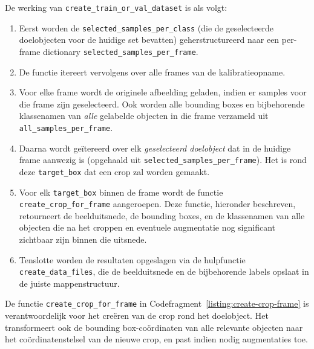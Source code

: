 De werking van \texttt{create\_train\_or\_val\_dataset} is als volgt:
\begin{enumerate}
    \item Eerst worden de \texttt{selected\_samples\_per\_class} (die de geselecteerde doelobjecten voor de huidige set bevatten) 
    geherstructureerd naar een per-frame dictionary \texttt{selected\_samples\_per\_frame}.
    \item De functie itereert vervolgens over alle frames van de kalibratieopname.
    \item Voor elke frame wordt de originele afbeelding geladen, indien er samples voor die frame zijn geselecteerd. 
    Ook worden alle bounding boxes en bijbehorende klassenamen van 
    \textit{alle} gelabelde objecten in die frame verzameld uit \texttt{all\_samples\_per\_frame}.
    \item Daarna wordt geïtereerd over elk \textit{geselecteerd doelobject}
    dat in de huidige frame aanwezig is (opgehaald uit \texttt{selected\_samples\_per\_frame}). 
    Het is rond deze \texttt{target\_box} dat een crop zal worden gemaakt.
    \item Voor elk \texttt{target\_box} binnen de frame wordt de functie \texttt{create\_crop\_for\_frame} aangeroepen. 
    Deze functie, hieronder beschreven, retourneert de beelduitsnede, de bounding boxes, en de klassenamen 
    van alle objecten die na het croppen en eventuele augmentatie nog significant zichtbaar zijn binnen die uitsnede.
    \item Tenslotte worden de resultaten opgeslagen via de hulpfunctie \texttt{create\_data\_files},
    die de beelduitsnede en de bijbehorende labels opslaat in de juiste mappenstructuur.
\end{enumerate}

De functie \texttt{create\_crop\_for\_frame} in Codefragment~\ref{listing:create-crop-frame} 
is verantwoordelijk voor het creëren van de crop rond het doelobject.
Het transformeert ook de bounding box-coördinaten van alle relevante objecten naar het coördinatenstelsel van de nieuwe crop,
en past indien nodig augmentaties toe.

